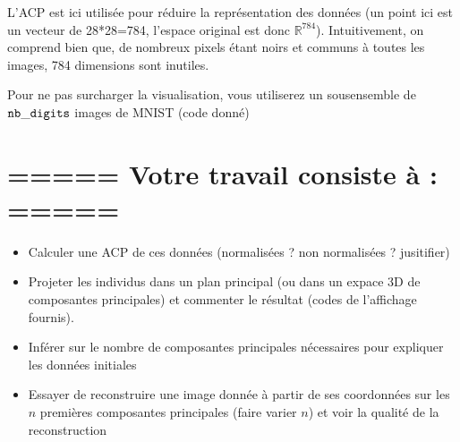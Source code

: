 \documentclass[letterpaper,10pt,french]{sphinxmanual}
\begin{document}
\sphinxAtStartPar
L’ACP est ici utilisée pour réduire la représentation des données (un point ici est un vecteur de 28*28=784, l’espace original est donc \(\mathbb{R}^{784}\)). Intuitivement, on comprend bien que, de nombreux pixels étant noirs et communs à toutes les images, 784 dimensions sont inutiles.

\sphinxAtStartPar
Pour ne pas surcharger la visualisation, vous utiliserez un sous\sphinxhyphen{}ensemble de \({\tt nb\_digits}\) images de MNIST (code donné)


\section{===== Votre travail consiste à : =====}
\label{\detokenize{TP2_ACP:votre-travail-consiste-a}}\begin{itemize}
\item {} 
\sphinxAtStartPar
Calculer une ACP de ces données (normalisées ? non normalisées ? jusitifier)

\item {} 
\sphinxAtStartPar
Projeter les individus dans un  plan principal (ou dans un expace 3D de composantes principales) et commenter le résultat (codes de l’affichage fournis).

\item {} 
\sphinxAtStartPar
Inférer sur le nombre de composantes principales nécessaires pour expliquer les données initiales

\item {} 
\sphinxAtStartPar
Essayer de reconstruire une image donnée à partir de ses coordonnées sur les \(n\) premières composantes principales (faire varier \(n\)) et voir la qualité de la reconstruction

\end{itemize}
\end{document}

